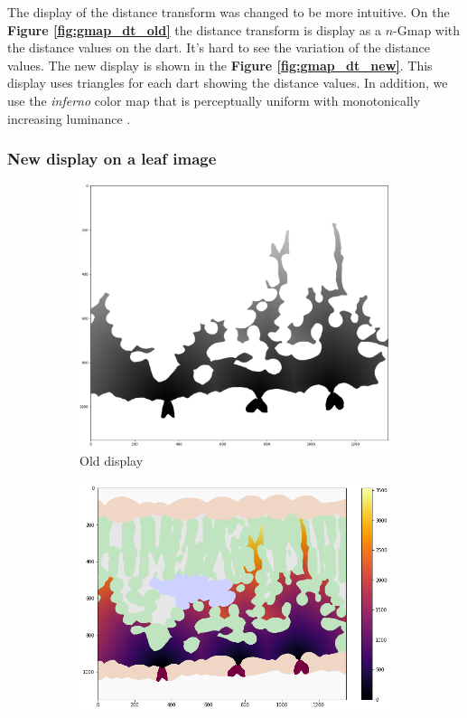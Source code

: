 The display of the distance transform was changed to be more intuitive. On
the \textbf{Figure \ref{fig:gmap_dt_old}} the distance transform is display as a
$n$-Gmap with the distance values on the dart. It's hard to see the variation of the
distance values. The new display is shown in the \textbf{Figure \ref{fig:gmap_dt_new}}.
This display uses triangles for each dart showing the distance values. In
addition, we use the \textit{inferno} color map that is perceptually uniform with 
monotonically increasing luminance \cite{Moreland}.

\subsubsection{New display on a leaf image}

\begin{figure}[ht]
    \centering
    \begin{subfigure}{0.45\textwidth}
        \centering
        \includegraphics[width=\textwidth]{figures/leaf_dt_old.png}
        \caption{Old display}
        \label{fig:leaf_dt_old}
    \end{subfigure}
    \hfill
    \begin{subfigure}{0.54\textwidth}
        \centering
        \includegraphics[width=\textwidth]{figures/leaf_dt_new.png}

\end{subfigure}
\end{figure}
